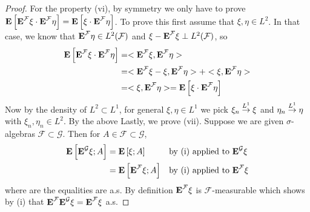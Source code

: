 \begin{proof}
For the property (vi), by symmetry we only have to prove $\textbf{E}\left[\textbf{E}^{\mathcal{F}} \xi
    \cdot \textbf{E}^{\mathcal{F}} \eta\right] = \textbf{E}\left[\xi \cdot
    \textbf{E}^{\mathcal{F}} \eta\right]$.  To prove this first assume
  that $\xi, \eta \in L^2$.  In that case, we know that
  $\textbf{E}^{\mathcal{F}} \eta
  \in L^2(\mathcal{F})$ and $\xi - \textbf{E}^{\mathcal{F}} \xi
  \perp L^2(\mathcal{F})$, so 
\begin{align*}
\textbf{E}\left[\textbf{E}^{\mathcal{F}} \xi
    \cdot \textbf{E}^{\mathcal{F}} \eta\right] &= <\textbf{E}^{\mathcal{F}} \xi
    ,\textbf{E}^{\mathcal{F}} \eta> \\
&= <\textbf{E}^{\mathcal{F}} \xi - \xi, \textbf{E}^{\mathcal{F}} \eta> + <\xi, \textbf{E}^{\mathcal{F}} \eta>\\
&= <\xi, \textbf{E}^{\mathcal{F}} \eta> = \textbf{E}\left[\xi \cdot \textbf{E}^{\mathcal{F}} \eta\right]\\
\end{align*}
Now by the density of $L^2 \subset L^1$, for general $\xi, \eta \in
L^1$ we pick $\xi_n \overset{L^1}\to \xi$ and $\eta_n \overset{L^1}\to \eta$ with
$\xi_n, \eta_n \in L^2$.  By the above 
Lastly, we prove (vii).  Suppose we are given $\sigma$-algebras
$\mathcal{F} \subset \mathcal{G}$.  Then for $A \in \mathcal{F}
\subset \mathcal{G}$,
\begin{align*}
\textbf{E}\left[\textbf{E}^{\mathcal{G}} \xi ; A\right] &= \textbf{E}\left[\xi
  ; A\right] & & \text{by (i) applied to
  $\textbf{E}^{\mathcal{G}} \xi$}\\
&= \textbf{E}\left[\textbf{E}^{\mathcal{F}} \xi
  ; A\right] & & \text{by (i) applied to
  $\textbf{E}^{\mathcal{F}} \xi$}\\
\end{align*}
where are the equalities are a.s.   By definition $\textbf{E}^{\mathcal{F}} \xi$ is
$\mathcal{F}$-measurable which shows by (i) that
$\textbf{E}^{\mathcal{F}} \textbf{E}^{\mathcal{G}} \xi
= \textbf{E}^{\mathcal{F}} \xi$ a.s.
\end{proof}

